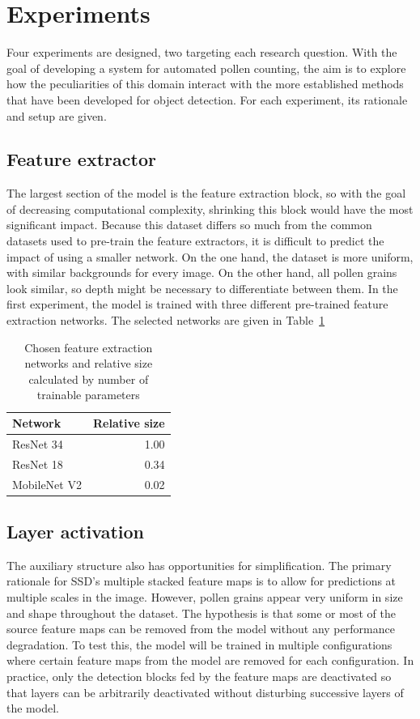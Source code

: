 \section{Experiments}\label{sec:method-experiments}
Four experiments are designed, two targeting each research question.
With the goal of developing a system for automated pollen counting, the aim is to explore how the peculiarities of this domain interact with the more established methods that have been developed for object detection.
For each experiment, its rationale and setup are given.

\subsection{Feature extractor}
The largest section of the model is the feature extraction block, so with the goal of decreasing computational complexity, shrinking this block would have the most significant impact.
Because this dataset differs so much from the common datasets used to pre-train the feature extractors, it is difficult to predict the impact of using a smaller network.
On the one hand, the dataset is more uniform, with similar backgrounds for every image. On the other hand, all pollen grains look similar, so depth might be necessary to differentiate between them.
In the first experiment, the model is trained with three different pre-trained feature extraction networks.
The selected networks are given in Table~\ref{tab:ex01}

\begin{table}[htbp]\centering
\caption[Feature extraction networks]{Chosen feature extraction networks and relative size calculated by number of trainable parameters}%
\label{tab:ex01}
\begin{tabular}{@{}lr@{}}\toprule
  Network & Relative size \\
  \midrule
     ResNet 34 & 1.00  \\
     ResNet 18 & 0.34  \\
  MobileNet V2 & 0.02  \\
  \bottomrule
\end{tabular}
\end{table}

\subsection{Layer activation}
The auxiliary structure also has opportunities for simplification.
The primary rationale for SSD's multiple stacked feature maps is to allow for predictions at multiple scales in the image.
However, pollen grains appear very uniform in size and shape throughout the dataset.
The hypothesis is that some or most of the source feature maps can be removed from the model without any performance degradation.
To test this, the model will be trained in multiple configurations where certain feature maps from the model are removed for each configuration.
In practice, only the detection blocks fed by the feature maps are deactivated so that layers can be arbitrarily deactivated without disturbing successive layers of the model.

